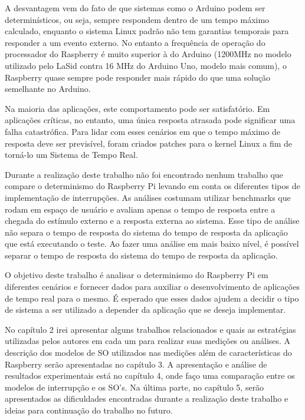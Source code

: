 A desvantagem vem do fato de que sistemas como o Arduino podem ser determinísticos, ou seja, sempre respondem dentro de um tempo máximo calculado, enquanto o sistema Linux padrão não tem garantias temporais para responder a um evento externo. No entanto a frequência de operação do processador do Raspberry é muito superior à do Arduino (1200MHz no modelo utilizado pelo LaSid contra 16 MHz do Arduino Uno, modelo mais comum), o Raspberry quase sempre pode responder mais rápido do que uma solução semelhante no Arduino.

Na maioria das aplicações, este comportamento pode ser satisfatório. Em aplicações críticas, no entanto, uma única resposta atrasada pode significar uma falha catastrófica. Para lidar com esses cenários em que o tempo máximo de resposta deve ser previsível, foram criados patches para o kernel Linux a fim de torná-lo um Sistema de Tempo Real. 


Durante a realização deste trabalho não foi encontrado nenhum trabalho que compare o determinismo do Raspberry Pi levando em conta os diferentes tipos de implementação de interrupções. As análises costumam utilizar benchmarks que rodam em espaço de usuário e avaliam apenas o tempo de resposta entre a chegada do estímulo externo e a resposta externa ao sistema. Esse tipo de análise não separa o tempo de resposta do sistema do tempo de resposta da aplicação que está executando o teste. Ao fazer uma análise em mais baixo nível, é possível separar o tempo de resposta do sistema do tempo de resposta da aplicação.


O objetivo deste trabalho é analisar o determinismo do Raspberry Pi em diferentes cenários e fornecer dados para auxiliar o desenvolvimento de aplicações de tempo real para o mesmo. É esperado que esses dados ajudem a decidir o tipo de sistema a ser utilizado a depender da aplicação que se deseja implementar.


No capítulo 2 irei apresentar alguns trabalhos relacionados e quais as estratégias utilizadas pelos autores em cada um para realizar suas medições ou análises. A descrição dos modelos de SO utilizados nas medições além de características do Raspberry serão apresentadas no capítulo 3. A apresentação e análise de resultados experimentais está no capítulo 4, onde faço uma comparação entre os modelos de interrupção e os SO's. Na última parte, no capítulo 5, serão apresentados as dificuldades encontradas durante a realização deste trabalho e ideias para continuação do trabalho no futuro.
